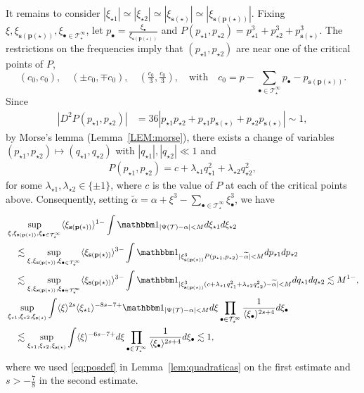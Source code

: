 \documentclass[a4paper,
11pt,  reqno]{amsart}
\newcommand{\5}{\textup{V}}
\newcommand{\ind}{\mathbbm 1}
\newcommand{\les}{\lesssim}
\newcommand{\wt}{\widetilde}
\theoremstyle{remark}
\newcommand{\bul}{\bullet}
\newcommand{\TT}{\mathcal{T}}
\newcommand{\al}{\alpha}
\newcommand{\ld}{\lambda}
\newcommand{\pb}{\mathbf{p}}
\newcommand{\sbf}{\mathbf{s}}
\newcommand{\jb}[1]
{\langle #1 \rangle}
\numberwithin{equation}{section}
\numberwithin{theorem}{section}
\begin{document}
It remains to consider $|\xi_{\star1}| \simeq |\xi_{\star2}| \simeq |\xi_{\sbf(\star)}| \simeq |\xi_{\sbf(\pb(\star))}| $.
Fixing $\xi, \xi_{\sbf(\pb(\star))}, \xi_{\bul\in\TT^\infty_\star}$, let $p_\bul = \frac{\xi_\bul}{\xi_{\sbf(\pb(\star))}}$ and $P(p_{\star1}, p_{\star2}) = p^3_{\star1} + p^3_{\star2} + p_{\sbf(\star)}^3$. The restrictions on the frequencies imply that $(p_{\star1},p_{\star2})$ are near one of the critical points of $P$,
$$(c_0,c_0), \quad (\pm c_0, \mp c_0), \quad (\tfrac{ c_0}{3}, \tfrac{ c_0}{3}), \quad \text{with} \quad c_0 = p - \sum_{\bul \in \TT^\infty_\star } p_\bul - p_{\sbf(\pb(\star))}.  $$
Since
\begin{align}
    | D^2 P(p_{\star1}, p_{\star2}) |
    &
    = 36 |p_{\star1} p_{\star2} + p_{\star1} p_{\sbf(\star)} + p_{\star2} p_{\sbf(\star)} |
    \sim 1,
\end{align}
by Morse's lemma (Lemma~\ref{LEM:morse}), there exists a change of variables $(p_{\star1}, p_{\star2}) \mapsto (q_{\star1}, q_{\star2})$ with $|q_{\star1}|, |q_{\star2}| \ll 1$ and
\begin{align}
    P(p_{\star1}, p_{\star2}) = c + \ld_{\star1} q_{\star1}^2 + \ld_{\star2} q_{\star2}^2,
\end{align}
for some $\ld_{\star1}, \ld_{\star2} \in \{\pm1 \}$,
{where $c$ is the value of $P$ at each of the critical points above.}
Consequently, setting $\wt\al = \al + \xi^3 - \sum_{\bul \in \TT^\infty_\star} \xi_\bul^3$, we have
\begin{align}
    &
    \sup_{\xi,  \xi_{\sbf(\pb(\star))}, \xi_{\bul\in\TT^\infty_\star}}
     \jb{\xi_{\sbf(\pb(\star))}}^{1-}
     \int
    \ind_{|\Psi(\TT) - \al| < M } d \xi_{\star1} d\xi_{\star2}
    \\
    &
    \quad
    \les
    \sup_{\xi, \xi_{\sbf(\pb(\star))}, \xi_{\bul\in\TT^\infty_\star}}
     \jb{\xi_{\sbf(\pb(\star))}}^{3-}
     \int
    \ind_{|\xi_{\sbf(\pb(\star))}^3 P(p_{\star1}, p_{ \star2}) - \wt\al| < M } d p_{\star1} dp_{\star2}
    \\
    &
    \quad
    \les
    \sup_{\xi, \xi_{\sbf(\pb(\star))}, \xi_{\bul\in\TT^\infty_\star}}
     \jb{\xi_{\sbf(\pb(\star))}}^{3-}
     \int
    \ind_{|\xi_{\sbf(\pb(\star))}^3 ( c + \ld_{\star1} q_{\star1}^2 + \ld_{\star2} q_{\star2}^2) - \wt\al| < M } d q_{\star1} dq_{\star2} \les
    M^{1-} ,
    \\
    &
    \sup_{\xi_{\star1}, \xi_{\star2}, {\xi_{\sbf(\star)} }}
    \int
    \jb{\xi}^{2s} \jb{\xi_{\star1}}^{-8s - 7 +} \ind_{|\Psi(\TT) - \al| < M } d \xi \prod_{\bul\in \TT^\infty_\star} \frac{1}{\jb{\xi_\bul}^{2s+4}} d\xi_\bul
    \\
    &
    \quad
    \les
    \sup_{\xi_{\star1}, \xi_{\star2}, {\xi_{\sbf(\star)} }}
    \int
    \jb{\xi}^{-6s - 7 + }  d \xi \prod_{\bul\in \TT^\infty_\star} \frac{1}{\jb{\xi_\bul}^{2s+4}} d\xi_\bul \les 1,
\end{align}
where we used \eqref{eq:posdef} in Lemma~\ref{lem:quadraticas} on the first estimate and $s>-\frac78$ in the second estimate.
\end{document}
